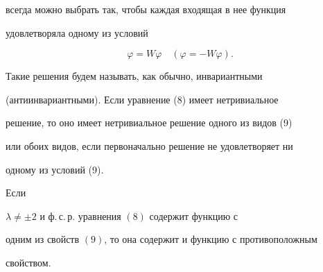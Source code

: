 всегда можно выбрать так, чтобы каждая входящая в нее функция


удовлетворяла одному из условий


\begin{equation}


\varphi=W\varphi\quad (\varphi=-W\varphi).


\end{equation}


Такие решения будем называть, как обычно, инвариантными


(антиинвариантными). Если уравнение (8) имеет нетривиальное


решение, то оно имеет нетривиальное решение одного из видов (9)


или обоих видов, если первоначально решение не удовлетворяет ни


одному из условий (9).








\begin{lem}


Если


$\lambda\neq\pm 2$ и ф.\,с.\,р. уравнения $(8)$ содержит функцию с


одним из свойств $(9)$, то она содержит и функцию с противоположным


свойством.


\end{lem}








